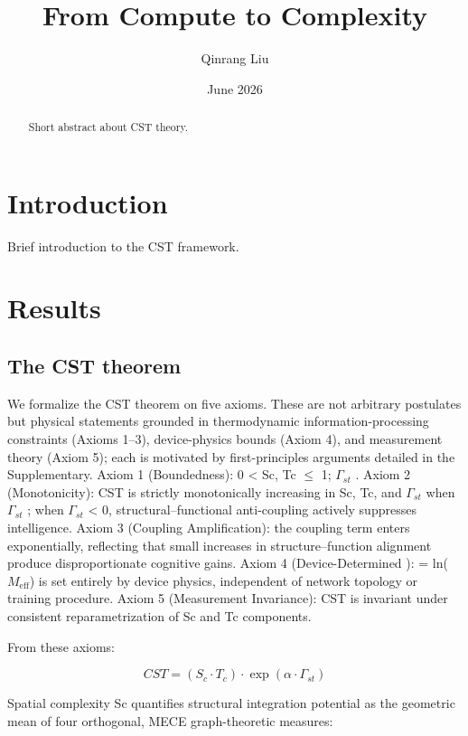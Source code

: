 \documentclass[a4paper,12pt]{article}
\title{From Compute to Complexity}
\author{Qinrang Liu}
\date{June 2026}
\begin{document}
\maketitle
\begin{abstract}
Short abstract about CST theory.
\end{abstract}
\section{Introduction}
Brief introduction to the CST framework.

\section{Results}

\subsection{The CST theorem}

We formalize the CST theorem on five axioms.
These are not arbitrary postulates but physical statements grounded in thermodynamic information-processing constraints (Axioms 1--3), device-physics bounds (Axiom 4), and measurement theory (Axiom 5); each is motivated by first-principles arguments detailed in the Supplementary.
Axiom 1 (Boundedness): 0 < Sc, Tc $\leq$ 1; $\Gamma_{st}$  \in  [-1, 1].
Axiom 2 (Monotonicity): CST is strictly monotonically increasing in Sc, Tc, and $\Gamma_{st}$ when $\Gamma_{st}$  ; when $\Gamma_{st}$ < 0, structural--functional anti-coupling actively suppresses intelligence.
Axiom 3 (Coupling Amplification): the coupling term enters exponentially, reflecting that small increases in structure--function alignment produce disproportionate cognitive gains.
Axiom 4 (Device-Determined  \alpha ):  \alpha  = ln($M_{\text{eff}}$) is set entirely by device physics, independent of network topology or training procedure.
Axiom 5 (Measurement Invariance): CST is invariant under consistent reparametrization of Sc and Tc components.

From these axioms:

\begin{equation}
CST = (S_c \cdot T_c) \cdot \exp(\alpha \cdot \Gamma_{st}) \tag{1}
\end{equation}

Spatial complexity Sc quantifies structural integration potential as the geometric mean of four orthogonal, MECE graph-theoretic measures:
\end{document}
